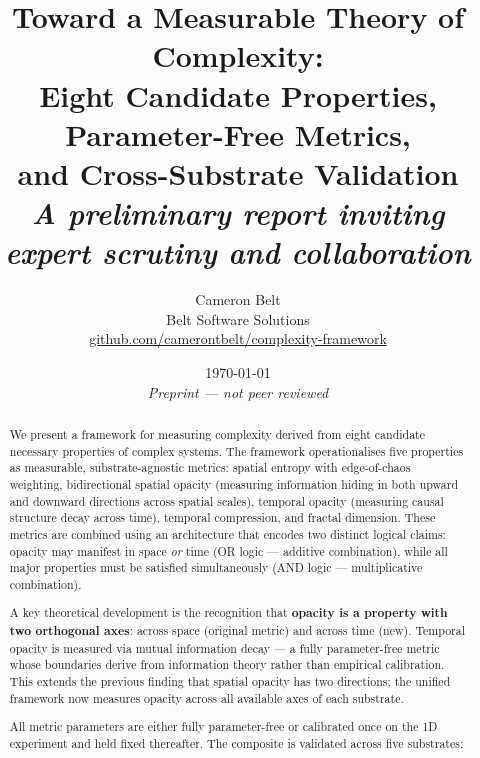 \documentclass[12pt,a4paper]{article}
\title{\textbf{Toward a Measurable Theory of Complexity:\\
Eight Candidate Properties, Parameter-Free Metrics,\\
and Cross-Substrate Validation}\\[0.8em]
\large\textit{A preliminary report inviting expert scrutiny and collaboration}}
\author{Cameron Belt\\
\small Belt Software Solutions\\
\small \href{https://github.com/camerontbelt/complexity-framework}{github.com/camerontbelt/complexity-framework}}
\date{\today\\[0.3em]
\small\textit{Preprint --- not peer reviewed}}
\begin{document}
\maketitle

\begin{abstract}
\noindent
We present a framework for measuring complexity derived from eight
candidate necessary properties of complex systems.
The framework operationalises five properties as measurable,
substrate-agnostic metrics: spatial entropy with edge-of-chaos
weighting, bidirectional spatial opacity (measuring information
hiding in both upward and downward directions across spatial
scales), temporal opacity (measuring causal structure decay across
time), temporal compression, and fractal dimension.
These metrics are combined using an architecture that encodes two
distinct logical claims: opacity may manifest in space \emph{or}
time (OR logic --- additive combination), while all major properties
must be satisfied simultaneously (AND logic --- multiplicative
combination).

A key theoretical development is the recognition that
\textbf{opacity is a property with two orthogonal axes}: across
space (original metric) and across time (new).
Temporal opacity is measured via mutual information decay --- a
fully parameter-free metric whose boundaries derive from information
theory rather than empirical calibration.
This extends the previous finding that spatial opacity has two
directions; the unified framework now measures opacity across all
available axes of each substrate.

All metric parameters are either fully parameter-free or calibrated
once on the 1D experiment and held fixed thereafter.
The composite is validated across five substrates:


\end{abstract}
\end{document}
